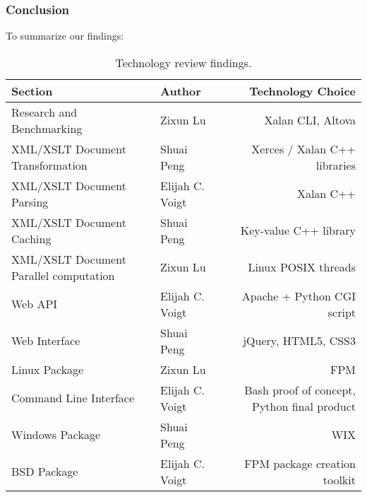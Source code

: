 \subsubsection{Conclusion}

To summarize our findings:

\begin{table}[H]
  \begin{center}
    \begin{tabular}{ | l | p{5cm} | r | }
    \hline
    Section & Author & Technology Choice\\ \hline
    Research and Benchmarking & Zixun Lu & Xalan CLI, Altova \\ \hline
    XML/XSLT Document Transformation & Shuai Peng & Xerces / Xalan C++ libraries \\ \hline
    XML/XSLT Document Parsing & Elijah C. Voigt & Xalan C++ \\ \hline
    XML/XSLT Document Caching & Shuai Peng & Key-value C++ library \\ \hline
    XML/XSLT Document Parallel computation & Zixun Lu & Linux POSIX threads \\ \hline
    Web API & Elijah C. Voigt & Apache + Python CGI script \\ \hline
    Web Interface & Shuai Peng & jQuery, HTML5, CSS3 \\ \hline
    Linux Package & Zixun Lu & FPM \\ \hline
    Command Line Interface& Elijah C. Voigt & Bash proof of concept, Python final product \\ \hline
    Windows Package & Shuai Peng & WIX \\ \hline
    BSD Package & Elijah C. Voigt & FPM package creation toolkit \\ \hline
    \end{tabular}
  \end{center}
  \caption{Technology review findings.}
\end{table}
